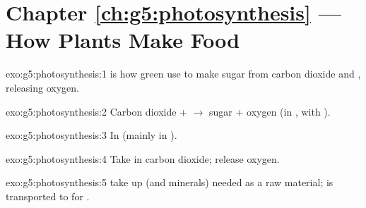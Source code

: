\section*{Chapter \ref{ch:g5:photosynthesis} --- How Plants Make Food}

\begin{solution}{exo:g5:photosynthesis:1}
 is how green  use   to make sugar from
carbon dioxide and , releasing oxygen.
\end{solution}

\begin{solution}{exo:g5:photosynthesis:2}
Carbon dioxide +  $\to$ sugar + oxygen (in , with
).
\end{solution}

\begin{solution}{exo:g5:photosynthesis:3}
In  (mainly in  ).
\end{solution}

\begin{solution}{exo:g5:photosynthesis:4}
Take in carbon dioxide; release oxygen.
\end{solution}

\begin{solution}{exo:g5:photosynthesis:5}
 take up  (and minerals) needed as a raw material;  is
transported to  for .
\end{solution}

